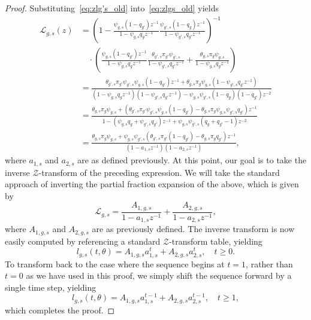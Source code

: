 \documentclass[letterpaper]{article} %
\begin{document}
\begin{proof}
Substituting~\eqref{eq:zlg's_old} into~\eqref{eq:zlgs_old} yields
\begin{align*}
    \mathcal{L}_{g,s}(z) &= \left( 1 - \frac{\psi_{g,s}(1-q_{g'})z^{-1}}{1 - \psi_{g,s}q_gz^{-1}} \frac{\psi_{g',s}(1-q_{g})z^{-1}}{1 - \psi_{g',s}q_{g'}z^{-1}} \right)^{-1}\\
    &\quad \cdot \left(\frac{\psi_{g,s}(1-q_{g'})z^{-1}}{1 - \psi_{g,s}q_gz^{-1}}\frac{\theta_{g',s} \pi_{g'} \psi_{g',s}}{1 - \psi_{g',s}q_{g'}z^{-1}} +  \frac{\theta_{g,s} \pi_g \psi_{g,s}}{1 - \psi_{g,s}q_gz^{-1}} \right) \\
    &= \frac{\theta_{g',s} \pi_{g'} \psi_{g',s}\psi_{g,s}(1-q_{g'})z^{-1} + \theta_{g,s} \pi_g \psi_{g,s} (1 - \psi_{g',s}q_{g'}z^{-1})}{(1 - \psi_{g,s}q_gz^{-1})(1 - \psi_{g',s}q_{g'}z^{-1}) - \psi_{g,s}\psi_{g',s}(1-q_{g})(1-q_{g'})z^{-2}} \\
    &= \frac{\theta_{g,s} \pi_g \psi_{g,s} + \left(\theta_{g',s} \pi_{g'} \psi_{g',s}\psi_{g,s}(1-q_{g'}) - \theta_{g,s} \pi_g \psi_{g,s}\psi_{g',s}q_{g'}\right)z^{-1} }{1 - (\psi_{g,s}q_g + \psi_{g',s}q_{g'})z^{-1} + \psi_{g,s}\psi_{g',s}(q_{g} + q_{g'} - 1)z^{-2}}  \\
    &= \frac{\theta_{g,s} \pi_g \psi_{g,s} + \psi_{g,s}\psi_{g',s}\left(\theta_{g',s} \pi_{g'} (1-q_{g'}) - \theta_{g,s} \pi_g q_{g'}\right)z^{-1} }{(1 - a_{1,s} z^{-1})(1 - a_{2,s} z^{-1})}, 
\end{align*}
where $a_{1,s}$ and $a_{2,s}$ are as defined previously. At this point, our goal is to take the inverse $\mathcal{Z}$-transform of the preceding expression. We will take the standard approach of inverting the partial fraction expansion of the above, which is given by
\begin{equation*}
    \mathcal{L}_{g,s} = \frac{A_{1,g,s}}{1-a_{1,s} z^{-1}} + \frac{A_{2,g,s}}{1 - a_{2,s} z^{-1}},
\end{equation*}
where $A_{1,g,s}$ and $A_{2,g,s}$ are as previously defined. The inverse transform is now easily computed by referencing a standard $\mathcal{Z}$-transform table, yielding
\begin{equation*}
    l_{g,s}(t,\theta) = 
    A_{1,g,s}a_{1,s}^t + A_{2,g,s}a_{2,s}^t, \quad  t\geq 0.
\end{equation*}
To transform back to the case where the sequence begins at $t=1$, rather than $t=0$ as we have used in this proof, we simply shift the sequence forward by a single time step, yielding
\begin{equation*}
    l_{g,s}(t,\theta) = 
    A_{1,g,s}a_{1,s}^{t-1} + A_{2,g,s}a_{2,s}^{t-1}, \quad  t\geq 1,
\end{equation*}
which completes the proof.
\end{proof}
\end{document}
